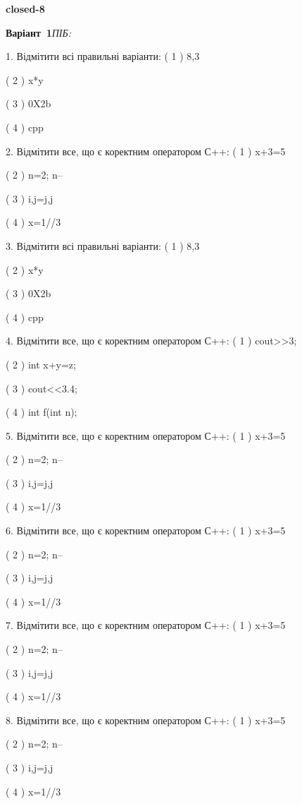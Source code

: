 \documentclass[11pt]{article}
\begin{document}
{\large\textbf{closed-8}}

\textbf{Варіант \No\,1}\hfill \textit{ПІБ:}\,\underline{\hspace{60mm}}
\vspace{4mm}

1. Відмітити всі правильні варіанти:
( 1 ) 8,3

( 2 ) x*y

( 3 ) 0X2b

( 4 ) cpp

2. Відмітити все, що є коректним оператором С++:
( 1 ) x+3=5

( 2 ) n=2; n--

( 3 ) i,j=j,j

( 4 ) x=1//3

3. Відмітити всі правильні варіанти:
( 1 ) 8,3

( 2 ) x*y

( 3 ) 0X2b

( 4 ) cpp

4. Відмітити все, що є коректним оператором С++:
( 1 ) cout>>3;

( 2 ) int x+y=z;

( 3 ) cout<<3.4;

( 4 ) int f(int n);

5. Відмітити все, що є коректним оператором С++:
( 1 ) x+3=5

( 2 ) n=2; n--

( 3 ) i,j=j,j

( 4 ) x=1//3

6. Відмітити все, що є коректним оператором С++:
( 1 ) x+3=5

( 2 ) n=2; n--

( 3 ) i,j=j,j

( 4 ) x=1//3

7. Відмітити все, що є коректним оператором С++:
( 1 ) x+3=5

( 2 ) n=2; n--

( 3 ) i,j=j,j

( 4 ) x=1//3

8. Відмітити все, що є коректним оператором С++:
( 1 ) x+3=5

( 2 ) n=2; n--

( 3 ) i,j=j,j

( 4 ) x=1//3









\newpage
\end{document}
